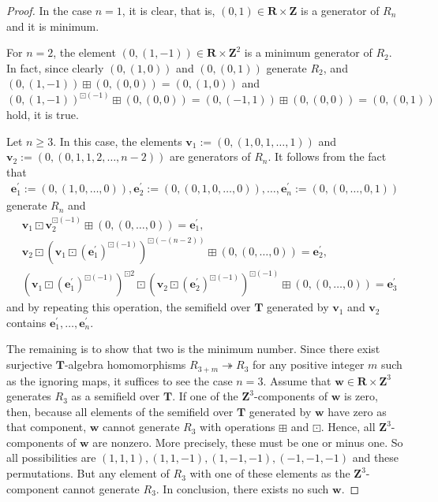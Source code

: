 \documentclass[a4paper,12pt]{amsart}
\begin{document}
\begin{proof}
In the case $n = 1$, it is clear, that is, $(0, 1) \in \boldsymbol{R} \times \boldsymbol{Z}$ is a generator of $R_n$ and it is minimum.

For $n = 2$, the element $(0, (1, -1)) \in \boldsymbol{R} \times \boldsymbol{Z}^2$ is a minimum generator of $R_2$.
In fact, since clearly $(0, (1, 0))$ and $(0, (0, 1))$ generate $R_2$, and $(0, (1, -1)) \boxplus (0, (0, 0)) = (0, (1, 0))$ and $(0, (1, -1))^{\boxdot (-1)} \boxplus (0, (0, 0)) = (0, (-1, 1)) \boxplus (0, (0, 0)) = (0, (0, 1))$ hold, it is true.

Let $n \ge 3$.
In this case, the elements $\boldsymbol{v}_1 := (0, (1, 0, 1, \ldots, 1))$ and $\boldsymbol{v}_2 := (0, (0, 1, 1, 2, \ldots, n - 2))$ are generators of $R_n$.
It follows from the fact that 
\begin{align*}
\boldsymbol{e}_1^{\prime} := (0, (1, 0, \ldots, 0)), \boldsymbol{e}_2^{\prime} := (0, (0, 1, 0, \ldots, 0)), \ldots, \boldsymbol{e}_n^{\prime} := (0, (0, \ldots, 0, 1))    
\end{align*}
generate $R_n$ and 
\begin{align*}
&\boldsymbol{v}_1 \boxdot \boldsymbol{v}_2^{\boxdot (-1)} \boxplus (0, (0, \ldots, 0)) = \boldsymbol{e}_1^{\prime},\\
&\boldsymbol{v}_2 \boxdot \left( \boldsymbol{v}_1 \boxdot (\boldsymbol{e}_1^{\prime})^{\boxdot (-1)} \right)^{\boxdot (-(n - 2))} \boxplus (0, (0, \ldots, 0)) = \boldsymbol{e}_2^{\prime},\\
& \left( \boldsymbol{v}_1 \boxdot (\boldsymbol{e}_1^{\prime})^{\boxdot (-1)} \right)^{\boxdot 2} \boxdot \left( \boldsymbol{v}_2 \boxdot (\boldsymbol{e}_2^{\prime})^{\boxdot (-1)} \right)^{\boxdot (-1)} \boxplus (0, (0, \ldots, 0)) = \boldsymbol{e}_3^{\prime}
\end{align*}
and by repeating this operation, the semifield over $\boldsymbol{T}$ generated by $\boldsymbol{v}_1$ and $\boldsymbol{v}_2$ contains $\boldsymbol{e}_1^{\prime}, \ldots, \boldsymbol{e}_n^{\prime}$.

The remaining is to show that two is the minimum number.
Since there exist surjective $\boldsymbol{T}$-algebra homomorphisms $R_{3 + m} \twoheadrightarrow R_3$ for any positive integer $m$ such as the ignoring maps, it suffices to see the case $n = 3$. 
Assume that $\boldsymbol{w} \in \boldsymbol{R} \times \boldsymbol{Z}^3$ generates $R_3$ as a semifield over $\boldsymbol{T}$.
If one of the $\boldsymbol{Z}^3$-components of $\boldsymbol{w}$ is zero, then, because all elements of the semifield over $\boldsymbol{T}$ generated by $\boldsymbol{w}$ have zero as that component, $\boldsymbol{w}$ cannot generate $R_3$ with operations $\boxplus$ and $\boxdot$.
Hence, all $\boldsymbol{Z}^3$-components of $\boldsymbol{w}$ are nonzero.
More precisely, these must be one or minus one.
So all possibilities are $(1, 1, 1), (1, 1, -1), (1, -1, -1), (-1, -1, -1)$ and these permutations.
But any element of $R_3$ with one of these elements as the $\boldsymbol{Z}^3$-component cannot generate $R_3$.
In conclusion, there exists no such $\boldsymbol{w}$.
\end{proof}
\end{document}
